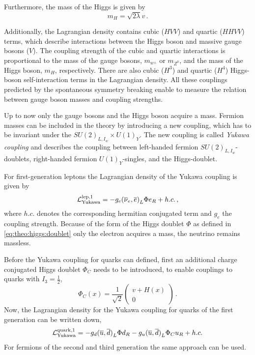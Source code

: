 Furthermore, the mass of the Higgs is given by
\begin{equation}
    m_H = \sqrt{2\lambda} v \,.
\end{equation}

Additionally, the Lagrangian density contains cubic ($HVV$) and quartic ($HHVV$) terms, which describe
interactions between the Higgs boson and massive gauge bosons ($V$).
The coupling strength of the cubic and quartic interactions is proportional
to the mass of the gauge bosons, $m_{w^\pm}$ or $m_{Z^0}$, and the mass of the Higgs boson, $m_H$, respectively.
There are also cubic ($H^3$) and quartic ($H^4$) Higgs-boson self-interaction terms in the Lagrangian density.
All these couplings predicted by the spontaneous symmetry breaking enable to measure the relation between gauge boson
masses and coupling strengths.

Up to now only the gauge bosons and the Higgs boson acquire a mass.
Fermion masses can be included in the theory by introducing a new coupling, which has to be invariant under the $SU{(2)}_{L,I_w} \times U{(1)}_Y$.
The new coupling is called \emph{Yukawa coupling} and describes the coupling between left-handed fermion $SU{(2)}_{L,I_w}$-doublets,
right-handed fermion $U{(1)}_Y$-singles, and the Higgs-doublet.

For first-generation leptons the Lagrangian density of the Yukawa coupling is given by
\begin{equation}
    \mathcal{L}_\text{Yukawa}^\text{lep,1} = - g_e {(\overline{\nu}_e, \overline{e})}_L \Phi e_R + h.c. \,,
\end{equation}
where $h.c.$ denotes the corresponding hermitian conjugated term and $g_e$ the coupling strength.
Because of the form of the Higgs doublet $\Phi$ as defined in \cref{eq:theo:higgs:doublet} only the electron
acquires a mass, the neutrino remains massless.

Before the Yukawa coupling for quarks can defined, first an additional charge conjugated Higgs doublet $\Phi_C$
needs to be introduced, to enable couplings to quarks with $I_3 = \frac{1}{2}$,
\begin{equation}
    \Phi_C(x) = \frac{1}{\sqrt{2}}
    \begin{pmatrix}
        v + H(x) \\ 0
    \end{pmatrix} \,.
\end{equation}
Now, the Lagrangian density for the Yukawa coupling for quarks of the first generation can be written down,
\begin{equation}
    \mathcal{L}_\text{Yukawa}^\text{quark,1} = -g_d {(\overline{u}, \overline{d})}_L \Phi d_R - g_u {(\overline{u}, \overline{d})}_L \Phi_C u_R + h.c.
\end{equation}
For fermions of the second and third generation the same approach can be used.

